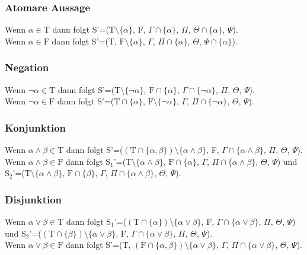 \subsubsection{Atomare Aussage}
Wenn $\alpha\in\textrm{T}$ dann folgt S'=($\textrm{T}\setminus\lbrace\alpha\rbrace$, F, $\Gamma\cap\lbrace\alpha\rbrace$, $\Pi$, $\Theta\cap\lbrace\alpha\rbrace$, $\Psi$).\\
Wenn $\alpha\in\textrm{F}$ dann folgt S'=(T, $\textrm{F}\setminus\lbrace\alpha\rbrace$, $\Gamma$, $\Pi\cap\lbrace\alpha\rbrace$, $\Theta$, $\Psi\cap\lbrace\alpha\rbrace$).

\subsubsection{Negation}
Wenn $\neg\alpha\in\textrm{T}$ dann folgt S'=($\textrm{T}\setminus\lbrace\neg\alpha\rbrace$, $\textrm{F}\cap\lbrace\alpha\rbrace$, $\Gamma\cap\lbrace\neg\alpha\rbrace$, $\Pi$, $\Theta$, $\Psi$).\\
Wenn $\neg\alpha\in\textrm{F}$ dann folgt S'=($\textrm{T}\cap\lbrace\alpha\rbrace$, $\textrm{F}\setminus\lbrace\neg\alpha\rbrace$, $\Gamma$, $\Pi\cap\lbrace\neg\alpha\rbrace$, $\Theta$, $\Psi$).

\subsubsection{Konjunktion}
Wenn $\alpha\wedge\beta\in\textrm{T}$ dann folgt S'=($(\textrm{T}\cap\lbrace\alpha,\beta\rbrace)\setminus\lbrace\alpha\wedge\beta\rbrace$, F, $\Gamma\cap\lbrace\alpha\wedge\beta\rbrace$, $\Pi$, $\Theta$, $\Psi$).\\
Wenn $\alpha\wedge\beta\in\textrm{F}$ dann folgt S$_{1}$'=($\textrm{T}\setminus\lbrace\alpha\wedge\beta\rbrace$, $\textrm{F}\cap\lbrace\alpha\rbrace$, $\Gamma$, $\Pi\cap\lbrace\alpha\wedge\beta\rbrace$, $\Theta$, $\Psi$) und S$_{2}$'=($\textrm{T}\setminus\lbrace\alpha\wedge\beta\rbrace$, $\textrm{F}\cap\lbrace\beta\rbrace$, $\Gamma$, $\Pi\cap\lbrace\alpha\wedge\beta\rbrace$, $\Theta$, $\Psi$).

\subsubsection{Disjunktion}
Wenn $\alpha\vee\beta\in\textrm{T}$ dann folgt S$_{1}$'=($(\textrm{T}\cap\lbrace\alpha\rbrace)\setminus\lbrace\alpha\vee\beta\rbrace$, F, $\Gamma\cap\lbrace\alpha\vee\beta\rbrace$, $\Pi$, $\Theta$, $\Psi$) und S$_{2}$'=($(\textrm{T}\cap\lbrace\beta\rbrace)\setminus\lbrace\alpha\vee\beta\rbrace$, F, $\Gamma\cap\lbrace\alpha\vee\beta\rbrace$, $\Pi$, $\Theta$, $\Psi$).\\
Wenn $\alpha\vee\beta\in\textrm{F}$ dann folgt S'=(T, $(\textrm{F}\cap\lbrace\alpha,\beta\rbrace)\setminus\lbrace\alpha\vee\beta\rbrace$, $\Gamma$, $\Pi\cap\lbrace\alpha\vee\beta\rbrace$, $\Theta$, $\Psi$).

